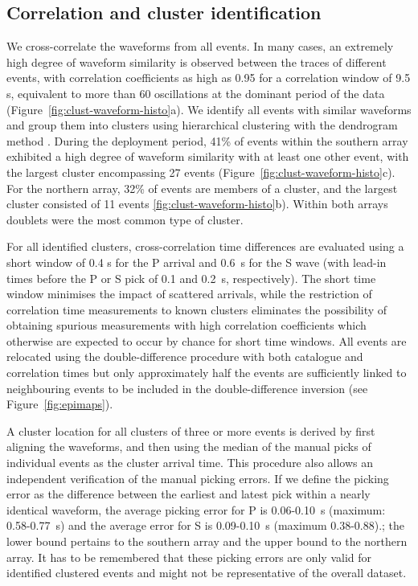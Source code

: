 \documentclass[reviewcopy]{elsarticle}
\begin{document}
\subsection{Correlation and cluster identification}

We cross-correlate the waveforms from all events.  In many cases, an
extremely high degree of waveform similarity is observed between the traces of
different events, with correlation coefficients
as high as 0.95 for a correlation window of 9.5 s, equivalent to more
than 60 oscillations at the dominant period of the data (Figure~\ref{fig:clust-waveform-histo}a).
We identify
all events with similar waveforms and group them into clusters using
hierarchical clustering with the dendrogram method .  During the deployment
period, 41\% of events within the southern array exhibited a high
degree of waveform similarity with at least one other event, with the
largest cluster encompassing 27 events (Figure~\ref{fig:clust-waveform-histo}c). For the northern array,  32\%
of events are members of a cluster, and the largest cluster consisted
of 11 events \ref{fig:clust-waveform-histo}b).   Within
both arrays doublets were the most common type of cluster.

For all identified clusters, cross-correlation time
differences are evaluated using a short window of 0.4 s for the P
arrival and 0.6~s for the S wave (with lead-in times before the P or S
pick of 0.1 and 0.2~s, respectively). The short time window minimises
the impact of scattered arrivals, while the restriction of correlation
time measurements to known clusters eliminates the possibility of
obtaining spurious measurements with high correlation coefficients
which otherwise are expected to occur by chance for short time windows.
All events are relocated using the double-difference procedure with
both catalogue and correlation times but only approximately half the
events are sufficiently linked to neighbouring events to be included
in the double-difference inversion (see Figure~\ref{fig:epimaps}).

A cluster location for all clusters of three or more events is derived
by first aligning the waveforms, and then using the median of the
manual picks of individual events as the cluster arrival time.  This
procedure also allows an independent verification of the manual
picking errors.  If we define the picking error as the difference
between the earliest and latest pick within a nearly identical
waveform, the average picking error for P is 0.06-0.10~s (maximum: 0.58-0.77~s)
and the average error for S is 0.09-0.10~s (maximum 0.38-0.88).; the
lower bound pertains to the southern array and the upper bound to the
northern array.
 It has to be remembered that these picking errors are only valid for
 identified clustered events and might not be representative of the
 overall dataset.
\end{document}
